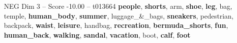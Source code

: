 \begin{textsample}{NEG Dim 3 – Score -10.00 – t013664}  \label{ex:f3_neg_040}
\textbf{people}, \textbf{shorts}, arm, \textbf{shoe}, \textbf{leg}, bag, temple, \textbf{human\_body}, \textbf{summer}, luggage\_\&\_bags, \textbf{sneakers}, pedestrian, backpack, \textbf{waist}, \textbf{leisure}, handbag, \textbf{recreation}, \textbf{bermuda\_shorts}, \textbf{fun}, \textbf{human\_back}, \textbf{walking}, \textbf{sandal}, \textbf{vacation}, boot, \textbf{calf}, \textbf{foot}

\end{textsample}
